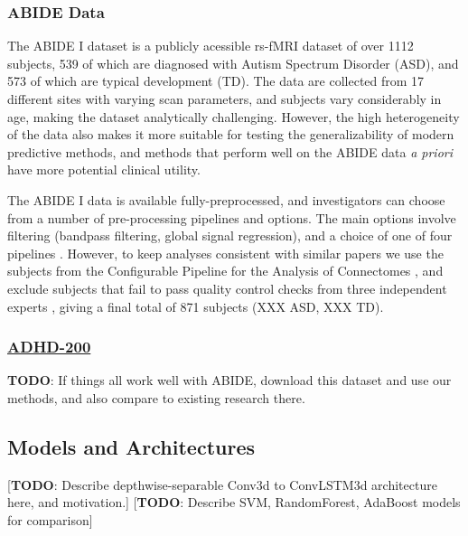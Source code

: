 \documentclass[10pt]{article}
\begin{document}
\subsubsection{ABIDE Data}

The ABIDE I dataset \citep{dimartinoAutismBrainImaging2014} is a publicly acessible rs-fMRI dataset of over
1112 subjects, 539 of which are diagnosed with Autism Spectrum Disorder (ASD),
and 573 of which are typical development (TD). The data are collected from 17 different sites with
varying scan parameters, and subjects vary considerably in age, making the dataset analytically
challenging. However, the high heterogeneity of the data also makes it more suitable for testing the
generalizability of modern predictive methods, and methods that perform well on the ABIDE data
\emph{a priori} have more potential clinical utility.

The ABIDE I data is available fully-preprocessed, and investigators can choose from a number of
pre-processing pipelines and options. The main options involve filtering (bandpass filtering, global
signal regression), and a choice of one of four pipelines \citep{dimartinoAutismBrainImaging2014}.
However, to keep analyses consistent with similar papers
\citet{abrahamDerivingReproducibleBiomarkers2017, mostafaDiagnosisAutismSpectrum2019,
yinDiagnosisAutismSpectrum2021, heinsfeldIdentificationAutismSpectrum2018} we use the subjects from
the Configurable Pipeline for the Analysis of Connectomes
\citep[CPAC;][]{cameronAutomatedAnalysisConnectomes2013}, and exclude subjects that fail to pass quality
control checks from three independent experts \citep[see][for
details]{abrahamDerivingReproducibleBiomarkers2017}, giving a final total of 871 subjects (XXX ASD,
XXX TD).

\subsubsection{\href{http://preprocessed-connectomes-project.org/adhd200/}{ADHD-200}}

\textbf{TODO}: If things all work well with ABIDE, download this dataset and use our methods, and also
compare to existing research there.

\subsection{Models and Architectures}

[\textbf{TODO}: Describe depthwise-separable Conv3d to ConvLSTM3d architecture here, and motivation.]
[\textbf{TODO}: Describe SVM, RandomForest, AdaBoost models for comparison]
\end{document}

